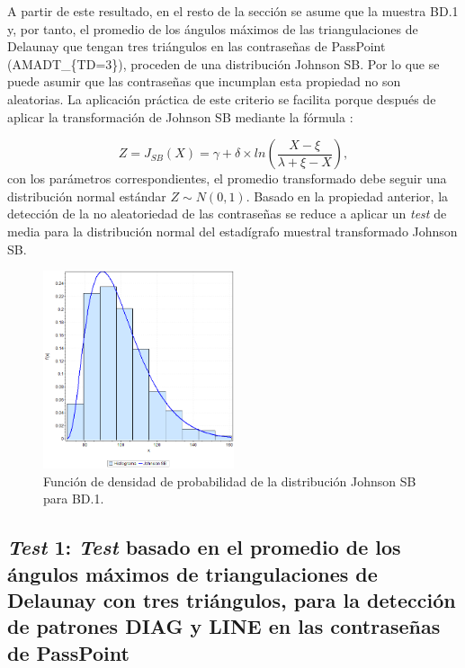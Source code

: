 \documentclass[12pt]{report}
\begin{document}
	 A partir de este resultado, en el resto de la sección se asume que la muestra BD.1 y, por tanto, el promedio de los ángulos máximos de las triangulaciones de Delaunay que tengan tres triángulos en las contraseñas de PassPoint (AMADT\_\{TD=3\}), proceden de una distribución Johnson SB. Por lo que se puede asumir que las contraseñas que incumplan esta propiedad no son aleatorias.
	 La aplicación práctica de este criterio se facilita porque después de  aplicar la transformación de Johnson SB mediante la fórmula \cite{30} :
	 
	  
	 \[
	  Z=J_{SB}(X) = \gamma + \delta \times ln\left(\frac{X - \xi}{\lambda + \xi - X}\right),
	 \]
	 con los parámetros correspondientes, el promedio transformado debe seguir una distribución normal estándar $Z\sim N(0,1)$. Basado en la propiedad anterior, la detección de la no aleatoriedad de las contraseñas se reduce a aplicar un \textit{test} de media para la distribución normal del estadígrafo muestral transformado Johnson SB.
	 \begin{figure}[ht]
	 	\centering
	 	
	 	\includegraphics[width=0.5\textwidth]{3td_fdp.png}
	 	\caption{Función de densidad de probabilidad de la  distribución Johnson SB para BD.1.}
	 	\label{3TD_FDP}
	 \end{figure}
	 
	 
\subsection{\textit{Test} 1: \textit{Test} basado en el promedio de los ángulos máximos de triangulaciones de Delaunay con tres triángulos, para la detección de patrones DIAG y LINE en las contraseñas de PassPoint}
\label{sec:1.2}
\end{document}
